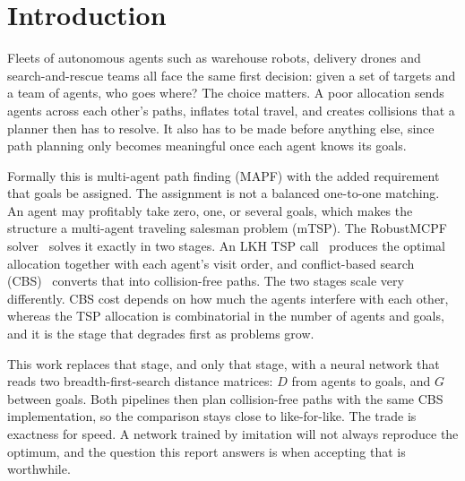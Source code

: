 \documentclass[11pt,a4paper]{article}
\begin{document}
\vspace{2pt}

\section{Introduction}

Fleets of autonomous agents such as warehouse robots, delivery drones and search-and-rescue teams
all face the same first decision: given a set of targets and a team of agents, who goes where? The
choice matters. A poor allocation sends agents across each other's paths, inflates total travel,
and creates collisions that a planner then has to resolve. It also has to be made before anything
else, since path planning only becomes meaningful once each agent knows its goals.

Formally this is multi-agent path finding (MAPF) with the added requirement that goals be assigned.
The assignment is not a balanced one-to-one matching. An agent may profitably take zero, one, or
several goals, which makes the structure a multi-agent traveling salesman problem (mTSP). The
RobustMCPF solver~\cite{robustmcpf} solves it exactly in two stages. An LKH TSP call~\cite{lkh}
produces the optimal allocation together with each agent's visit order, and conflict-based search
(CBS)~\cite{cbs} converts that into collision-free paths. The two stages scale very differently.
CBS cost depends on how much the agents interfere with each other, whereas the TSP allocation is
combinatorial in the number of agents and goals, and it is the stage that degrades first as
problems grow.

This work replaces that stage, and only that stage, with a neural network that reads two
breadth-first-search distance matrices: $D$ from agents to goals, and $G$ between goals. Both
pipelines then plan collision-free paths with the same CBS implementation, so the comparison stays
close to like-for-like. The trade is exactness for speed.
A network trained by imitation will not always reproduce the optimum, and the question this report
answers is when accepting that is worthwhile.
\end{document}

